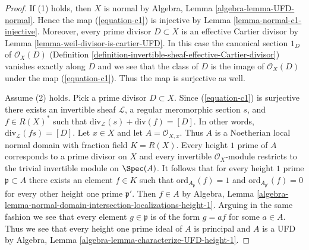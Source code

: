 \begin{proof}
If (1) holds, then $X$ is normal by
Algebra, Lemma \ref{algebra-lemma-UFD-normal}.
Hence the map (\ref{equation-c1}) is injective by
Lemma \ref{lemma-normal-c1-injective}. Moreover,
every prime divisor $D \subset X$ is an effective
Cartier divisor by Lemma \ref{lemma-weil-divisor-is-cartier-UFD}.
In this case the canonical section $1_D$ of $\mathcal{O}_X(D)$
(Definition \ref{definition-invertible-sheaf-effective-Cartier-divisor})
vanishes exactly along $D$ and we see that the class of $D$ is the
image of $\mathcal{O}_X(D)$ under the map (\ref{equation-c1}).
Thus the map is surjective as well.

\medskip\noindent
Assume (2) holds. Pick a prime divisor $D \subset X$.
Since (\ref{equation-c1}) is surjective there exists an invertible
sheaf $\mathcal{L}$, a regular meromorphic section $s$, and $f \in R(X)^*$
such that $\text{div}_\mathcal{L}(s) + \text{div}(f) = [D]$.
In other words, $\text{div}_\mathcal{L}(fs) = [D]$.
Let $x \in X$ and let $A = \mathcal{O}_{X, x}$. Thus $A$ is
a Noetherian local normal domain with fraction field $K = R(X)$.
Every height $1$ prime of $A$ corresponds to a prime divisor on $X$
and every invertible $\mathcal{O}_X$-module restricts to the
trivial invertible module on $\Spec(A)$. It follows that for every
height $1$ prime $\mathfrak p \subset A$ there exists an element $f \in K$
such that $\text{ord}_{A_\mathfrak p}(f) = 1$ and
$\text{ord}_{A_{\mathfrak p'}}(f) = 0$ for every other
height one prime $\mathfrak p'$. Then $f \in A$ by Algebra, Lemma
\ref{algebra-lemma-normal-domain-intersection-localizations-height-1}.
Arguing in the same fashion we see that every element $g \in \mathfrak p$
is of the form $g = af$ for some $a \in A$. Thus we see that every
height one prime ideal of $A$ is principal and $A$ is a UFD
by Algebra, Lemma \ref{algebra-lemma-characterize-UFD-height-1}.
\end{proof}







